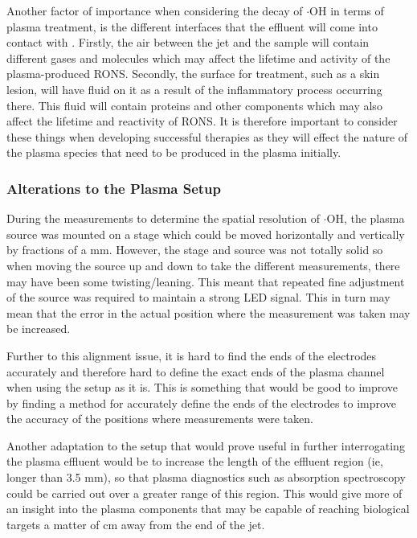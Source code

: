 \documentclass[11pt, oneside]{article}   	%
\begin{document}
Another factor of importance when considering the decay of $\cdot$OH in terms of plasma treatment, is the different interfaces that the effluent will come into contact with \cite{Hirst2016}.
Firstly, the air between the jet and the sample will contain different gases and molecules which may affect the lifetime and activity of the plasma-produced RONS.
Secondly, the surface for treatment, such as a skin lesion, will have fluid on it as a result of the inflammatory process occurring there.
This fluid will contain proteins and other components which may also affect the lifetime and reactivity of RONS.
It is therefore important to consider these things when developing successful therapies as they will effect the nature of the plasma species that need to be produced in the plasma initially.

\subsubsection{Alterations to the Plasma Setup}

During the measurements to determine the spatial resolution of $\cdot$OH, the plasma source was mounted on a stage which could be moved horizontally and vertically by fractions of a mm.
However, the stage and source was not totally solid so when moving the source up and down to take the different measurements, there may have been some twisting/leaning. This meant that repeated fine adjustment of the source was required to maintain a strong LED signal. 
This in turn may mean that the error in the actual position where the measurement was taken may be increased. 

Further to this alignment issue, it is hard to find the ends of the electrodes accurately and therefore hard to define the exact ends of the plasma channel when using the setup as it is.
This is something that would be good to improve by finding a method for accurately define the ends of the electrodes to improve the accuracy of the positions where measurements were taken.

Another adaptation to the setup that would prove useful in further interrogating the plasma effluent would be to increase the length of the effluent region (ie, longer than 3.5 mm), so that plasma diagnostics such as absorption spectroscopy could be carried out over a greater range of this region.
This would give more of an insight into the plasma components that may be capable of reaching biological targets a matter of cm away from the end of the jet.
\end{document}
